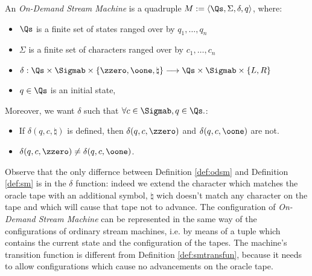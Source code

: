 
\begin{defn}
  \label{def:odsm}
An \emph{On-Demand Stream Machine} is a quadruple
$M:= \langle \Qs,\Sigma, \delta,q\rangle$,
where:
\begin{itemize}
\itemsep0em
\item $\Qs$ is a finite set of states ranged over by
$q_1,\dots, q_n$
%
\item $\Sigma$ is a finite set of characters ranged
over by $c_1,\dots, c_n$
%
\item $\delta:\Qs \times \Sigmab \times
\{\zzero, \oone, \natural\} \longrightarrow \Qs
\times \Sigmab \times \{L,R\}$
\item $q\in \Qs$ is an initial state,
\end{itemize}

Moreover, we want $\delta$ such that $\forall c \in \Sigmab, q \in \Qs.$:
\begin{itemize}
  \item If
  $\delta(q, c, \natural)$ is defined, then $\delta(q, c, \zzero)$ and $\delta(q, c, \oone)$
  are not.
  \item $\delta(q, c, \zzero)\neq \delta(q, c, \oone)$.
\end{itemize}
\end{defn}

Observe that the only differnce between Definition \ref{def:odsm} and
Definition \ref{def:sm} is in the $\delta$ function: indeed we
extend the character which matches the oracle tape with an additional symbol,
$\natural$ wich doesn't match any character on the tape and which will cause
that tape not to advance.
%
The configuration of \emph{On-Demand Stream Machine} can be represented in
the same way of the configurations of ordinary stream machines, i.e. by
means of a tuple which contains the current state and the configuration of
the tapes.
%
The machine's transition function is different from
Definition \ref{def:smtransfun}, because it needs to allow configurations
which cause no advancements on the oracle tape.

